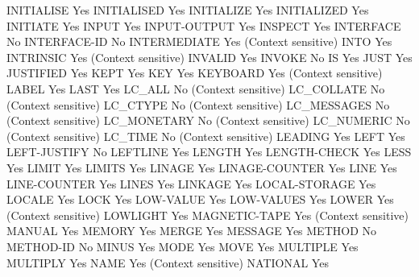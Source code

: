 INITIALISE                      Yes
INITIALISED                     Yes
INITIALIZE                      Yes
INITIALIZED                     Yes
INITIATE                        Yes
INPUT                           Yes
INPUT-OUTPUT                    Yes
INSPECT                         Yes
INTERFACE                       No
INTERFACE-ID                    No
INTERMEDIATE                    Yes (Context sensitive)
INTO                            Yes
INTRINSIC                       Yes (Context sensitive)
INVALID                         Yes
INVOKE                          No
IS                              Yes
JUST                            Yes
JUSTIFIED                       Yes
KEPT                            Yes
KEY                             Yes
KEYBOARD                        Yes (Context sensitive)
LABEL                           Yes
LAST                            Yes
LC_ALL                          No (Context sensitive)
LC_COLLATE                      No (Context sensitive)
LC_CTYPE                        No (Context sensitive)
LC_MESSAGES                     No (Context sensitive)
LC_MONETARY                     No (Context sensitive)
LC_NUMERIC                      No (Context sensitive)
LC_TIME                         No (Context sensitive)
LEADING                         Yes
LEFT                            Yes
LEFT-JUSTIFY                    No
LEFTLINE                        Yes
LENGTH                          Yes
LENGTH-CHECK                    Yes
LESS                            Yes
LIMIT                           Yes
LIMITS                          Yes
LINAGE                          Yes
LINAGE-COUNTER                  Yes
LINE                            Yes
LINE-COUNTER                    Yes
LINES                           Yes
LINKAGE                         Yes
LOCAL-STORAGE                   Yes
LOCALE                          Yes
LOCK                            Yes
LOW-VALUE                       Yes
LOW-VALUES                      Yes
LOWER                           Yes (Context sensitive)
LOWLIGHT                        Yes
MAGNETIC-TAPE                   Yes (Context sensitive)
MANUAL                          Yes
MEMORY                          Yes
MERGE                           Yes
MESSAGE                         Yes
METHOD                          No
METHOD-ID                       No
MINUS                           Yes
MODE                            Yes
MOVE                            Yes
MULTIPLE                        Yes
MULTIPLY                        Yes
NAME                            Yes (Context sensitive)
NATIONAL                        Yes
